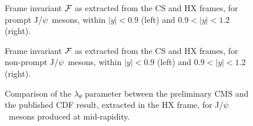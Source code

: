 \documentclass[12pt]{article}
\newcommand{\JPsi}{J/$\psi$}
\begin{document}
\begin{figure}[htbp]
\centering
{}
\caption{Frame invariant $\cal{F}$ as extracted from
  the CS and HX frames, for prompt \JPsi\ mesons, within $|y| < 0.9$ (left)
  and $0.9 < |y| < 1.2$ (right).}
\end{figure}

\begin{figure}[htbp]
\centering
{}
\caption{Frame invariant $\cal{F}$ as extracted from
  the CS and HX frames, for non-prompt \JPsi\ mesons, within $|y| < 0.9$
  (left) and $0.9 < |y| < 1.2$ (right).}
\end{figure}

\clearpage

\begin{figure}[htbp]
\centering
{}
\caption{Comparison of the $\lambda_\theta$ parameter between the
  preliminary CMS and the published CDF result, extracted in the HX
  frame, for \JPsi\ mesons produced at mid-rapidity.}
\end{figure}
\end{document}
